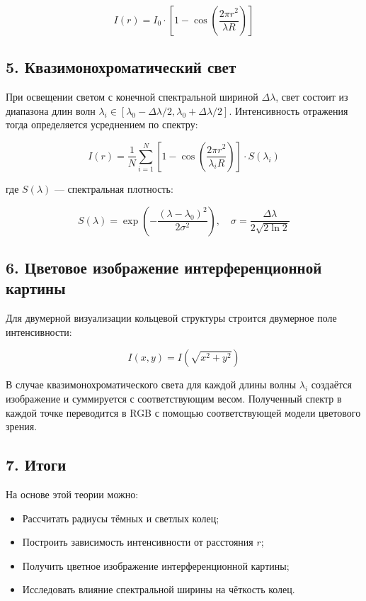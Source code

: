 \documentclass[a4paper,11pt]{article}
\theoremstyle{definition}
\begin{document}
\[
I(r) = I_0 \cdot \left[1 - \cos\left(\frac{2\pi r^2}{\lambda R} \right)\right]
\]



\subsection*{5. Квазимонохроматический свет}
При освещении светом с конечной спектральной шириной \( \Delta\lambda \), свет состоит из диапазона 
длин волн \( \lambda_i \in [\lambda_0 - \Delta\lambda/2, \lambda_0 + \Delta\lambda/2] \). 
Интенсивность отражения тогда определяется усреднением по спектру:

\[
I(r) = \frac{1}{N} \sum_{i=1}^{N} \left[1 - \cos\left( \frac{2\pi r^2}{\lambda_i R} \right) \right] \cdot S(\lambda_i)
\]

где \( S(\lambda) \) — спектральная плотность:

\[
S(\lambda) = \exp\left( -\frac{(\lambda - \lambda_0)^2}{2\sigma^2} \right), \quad \sigma = \frac{\Delta\lambda}{2\sqrt{2 \ln 2}}
\]



\subsection*{6. Цветовое изображение интерференционной картины}
Для двумерной визуализации кольцевой структуры строится двумерное поле интенсивности:

\[
I(x, y) = I\left( \sqrt{x^2 + y^2} \right)
\]

В случае квазимонохроматического света для каждой длины волны \( \lambda_i \) создаётся изображение 
и суммируется с соответствующим весом. Полученный спектр в каждой точке переводится в RGB с помощью 
соответствующей модели цветового зрения.



\subsection*{7. Итоги}
На основе этой теории можно:
\begin{itemize}
    \item Рассчитать радиусы тёмных и светлых колец;
    \item Построить зависимость интенсивности от расстояния \( r \);
    \item Получить цветное изображение интерференционной картины;
    \item Исследовать влияние спектральной ширины на чёткость колец.
\end{itemize}
\end{document}
